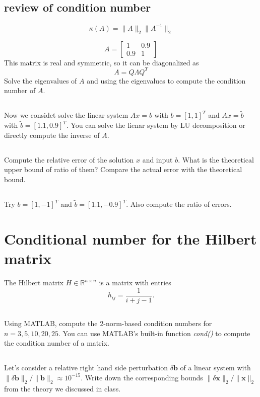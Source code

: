 \documentclass{article}%
\begin{document}
\subsection{review of condition number}
$$
\kappa(A)=\|A\|_2\|A^{-1}\|_2
$$

$$
A=\begin{bmatrix}
  1&0.9\\ 
  0.9&1
\end{bmatrix}
$$
This matrix is real and symmetric, so it can be diagonalized as 
$$
A=Q\Lambda Q^T
$$
Solve the eigenvalues of $A$ and using the eigenvalues to compute the condition number of $A$.

\subsection{}
Now we considet solve the linear system $Ax=b$ with $b=[1,1]^T$ and $Ax=\tilde{b}$ with $\tilde{b}=[1.1,0.9]^T$. You can solve the lienar system by LU decomposition or directly compute the inverse of $A$. 

\subsection{}
Compute the relative error of the solution $x$ and input $b$. What is the theoretical upper bound of ratio of them? Compare the actual error with the theoretical bound.

\subsection{}
Try $b=[1,-1]^T$ and $\tilde{b}=[1.1,-0.9]^T$. Also compute the ratio of errors.




\section{Conditional number for the Hilbert matrix}  
The Hilbert matrix $H\in \mathbb R^{n\times n}$ is a matrix with
  entries
  $$
  h_{ij} = \frac{1}{i+j-1}.
  $$ 
\subsection{}
Using MATLAB, compute the 2-norm-based condition
  numbers for $n=3,5,10,20,25$.  You can use MATLAB's built-in function \textit{cond()} to compute the condition number of a matrix.
  
\subsection{}
  Let's consider a relative right hand
  side perturbation $\delta\boldsymbol b$ of a linear system with
  $\|\delta\boldsymbol b\|_2/\|\boldsymbol b\|_2\approx
  10^{-15}$. Write down the corresponding bounds $\|\delta\boldsymbol
  x\|_2/\|\boldsymbol x\|_2$ from the theory we discussed in class.
\end{document}
